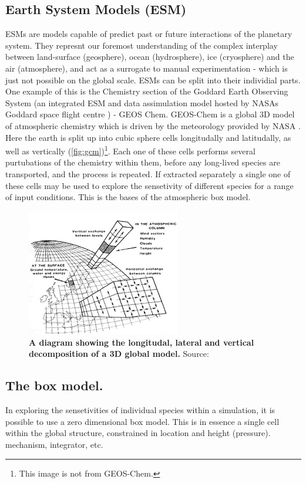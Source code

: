 \subsection{Earth System Models (ESM)}
  ESMs are models capable of predict past or future interactions of the planetary system. They represnt our foremost understanding of the complex interplay between land-surface (geosphere), ocean (hydrosphere), ice (cryosphere) and the air (atmosphere), and act as a surrogate to manual experimentation -  which is just not possible on the global scale.
ESMs can be split into their individial parts. One example of this is the Chemistry section of the Goddard Earth Observing System (an integrated ESM and data assimulation model hosted by NASAs Goddard space flight centre \citep{geoschem}) - GEOS Chem. GEOS-Chem is a global 3D model of atmospheric chemistry which is driven by the meteorology provided by NASA \citep{geos}. Here the earth is split up into cubic sphere cells longitudally and latitudally, as well as vertically (\autoref{fig:gcm})\footnote{This image is not from GEOS-Chem.}. Each one of these cells performs several purtubations of the chemistry within them, before any long-lived species are transported, and the process is repeated. If extracted separately a single one of these cells may be used to explore the sensetivity of different species for a range of input conditions. This is the bases of the atmospheric box model.
\begin{figure}
  \centering
  \includegraphics[width=0.6\textwidth]{gcm.jpg}
  \caption{\textbf{A diagram showing the longitudal, lateral and vertical decomposition of a 3D global model.} Source: \citep{gcm}}
  \label{fig:gcm}
\end{figure}
\subsection{The box model.}
In exploring the sensetivities of individual species within a simulation, it is possible to use a zero dimensional box model. This is in essence a single cell within the global structure, constrained in location and height (pressure).
mechanism,
integrator,
etc.

